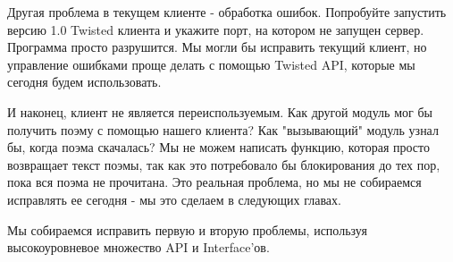 Другая проблема в текущем клиенте - обработка ошибок. Попробуйте 
запустить версию 1.0 Twisted клиента и укажите порт, на котором 
не запущен сервер. Программа просто разрушится. Мы могли бы 
исправить текущий клиент, но управление ошибками проще делать 
с помощью Twisted API, которые мы сегодня будем использовать. 


И наконец, клиент не является переиспользуемым. Как другой 
модуль мог бы получить поэму с помощью нашего клиента? Как  
"вызывающий" модуль узнал бы, когда поэма скачалась? Мы не можем 
написать функцию, которая просто возвращает текст поэмы, так как 
это потребовало бы блокирования до тех пор, пока вся поэма не 
прочитана. Это реальная проблема, но мы не собираемся исправлять 
ее сегодня - мы это сделаем в следующих главах.



Мы собираемся исправить первую и вторую проблемы, используя 
высокоуровневое множество API и Interface'ов.


